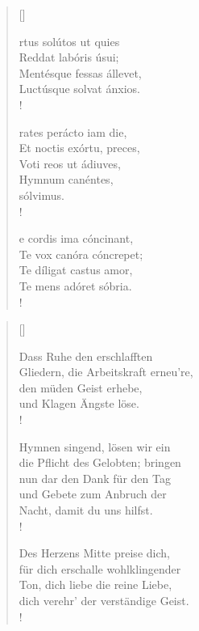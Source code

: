 {\setlength{\columnsep}{1cm}
\begin{multicols}{2} 
\begin{verse}[\versewidth]
 
{\small{
rtus solútos ut quies\\
Reddat labóris úsui;\\
Mentésque fessas állevet,\\
Luctúsque solvat ánxios.\\!

rates perácto iam die,\\
Et noctis exórtu, preces,\\ 
Voti reos ut ádiuves,\\ 
Hymnum canéntes,\\
sólvimus.\\!

e cordis ima cóncinant, \\
Te vox canóra cóncrepet; \\
Te díligat castus amor, \\
Te mens adóret sóbria. \\!}}
\end{verse}

\columnbreak

\begin{verse}[\versewidth]
 
{\small\rm{ Dass Ruhe den erschlafften\\
Gliedern, die Arbeitskraft erneu're,\\
den müden Geist erhebe,\\
und Klagen Ängste löse.\\!

 Hymnen singend, lösen wir ein\\
die Pflicht des Gelobten; bringen\\
nun dar den Dank für den Tag\\
und Gebete zum Anbruch der\\
Nacht, damit du uns hilfst.\\!

 Des Herzens Mitte preise dich,\\
für dich erschalle wohlklingender\\
Ton, dich liebe die reine Liebe,\\
dich verehr' der verständige Geist.\\!}}
\end{verse}
\end{multicols}
}



